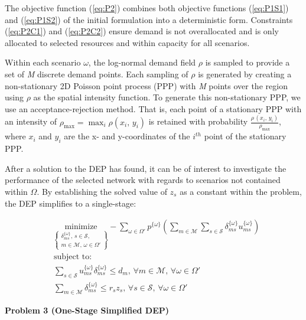 \documentclass[onecolumn,draftcls]{IEEEtran}
\begin{document}
The objective function (\ref{eq:P2}) combines both objective functions (\ref{eq:P1S1}) and (\ref{eq:P1S2}) of the initial formulation into a deterministic form.  Constraints (\ref{eq:P2C1}) and (\ref{eq:P2C2})	ensure demand is not overallocated and is only allocated to selected resources and within capacity for all scenarios.

Within each scenario $\omega$, the log-normal demand field $\rho$ is sampled to provide a set of \textit{M} discrete demand points.  Each sampling of $\rho$ is generated by creating a non-stationary 2D Poisson point process (PPP) with \textit{M} points over the region using $\rho$ as the spatial intensity function.  To generate this non-stationary PPP, we use an acceptance-rejection method.  That is, each point of a stationary PPP with an intensity of $\rho_{\max} = \max_i\rho\left(x_i,\, y_i\right)$ is retained with probability $\frac{\rho\,\left(x_i,\, y_i\right)}{\rho_{\max}}$, where $x_i$ and $y_i$ are the x- and y-coordinates of the $i^{th}$ point of the stationary PPP.

After a solution to the DEP has found, it can be of interest to investigate the performance of the selected network with regards to scenarios not contained within $\Omega$.  By establishing the solved value of $z_s$ as a constant within the problem, the DEP simplifies to a single-stage:

\vspace{5mm}
\begin{tcolorbox}[title = Problem 3 (One-Stage Simplified DEP)]
\begin{align}
& 
\underset{\left\{ \substack{
	\delta_{ms}^{\{\omega\}},\,	s \in \mathcal{S},\\
	m \in \mathcal{M},\, \omega \in \Omega'} \right\}} {\text{minimize}}
- \sum_{\omega \in \Omega'} p^{\{\omega\}} \left( \sum_{m \in \mathcal{M}} \sum_{s \in \mathcal{S}} \delta_{ms}^{\{\omega\}} u_{ms}^{\{\omega\}} \right) \label{eq:P3}\\
& \text{subject to:}  \nonumber \\
& \sum_{s \in \mathcal{S}} u_{ms}^{\{\omega\}} \delta_{ms}^{\{\omega\}} \leq d_m,\, \forall m \in \mathcal{M},\, \forall \omega \in \Omega' \label{eq:P3C1}\\
& \sum_{m \in \mathcal{M}} \delta_{ms}^{\{\omega\}} \leq r_s z_s,\, \forall s \in \mathcal{S},\, \forall \omega \in \Omega' \label{eq:P3C2}
\end{align}
\end{tcolorbox}

\iffalse
\vspace{5mm}
\noindent \textbf{Problem 3 (One-Stage Simplified DEP)}
\end{document}
